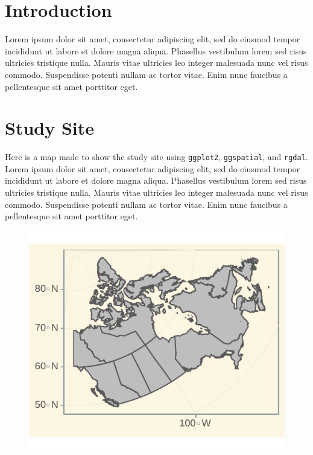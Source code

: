 \documentclass[article,30pt,extrafontsizes]{memoir}
\begin{document}
\begin{multicols*}{3}
\small{\noindent
\section{Introduction}\label{introduction}

Lorem ipsum dolor sit amet, \autocite{holden_identifying_2012}
consectetur adipiscing elit, sed do eiusmod tempor incididunt ut labore
et dolore magna aliqua. Phasellus vestibulum lorem sed risus ultricies
tristique nulla. Mauris vitae ultricies leo integer malesuada nunc vel
risus commodo. Suspendisse potenti nullam ac tortor vitae. Enim nunc
faucibus a pellentesque sit amet porttitor eget.

\section{Study Site}\label{study-site}

Here is a map made to show the study site using \texttt{ggplot2},
\texttt{ggspatial}, and \texttt{rgdal}. Lorem ipsum dolor sit amet,
\autocite{middleton_geological_nodate} consectetur adipiscing elit, sed
do eiusmod tempor incididunt ut labore et dolore magna aliqua. Phasellus
vestibulum lorem sed risus ultricies tristique nulla. Mauris vitae
ultricies leo integer malesuada nunc vel risus commodo. Suspendisse
potenti nullam ac tortor vitae. Enim nunc faucibus a pellentesque sit
amet porttitor eget.

\begin{figure}

{\centering \includegraphics[width=0.8\linewidth]{skeleton_files/figure-latex/unnamed-chunk-2-1} 

}
\end{figure}}
\end{multicols*}
\end{document}
